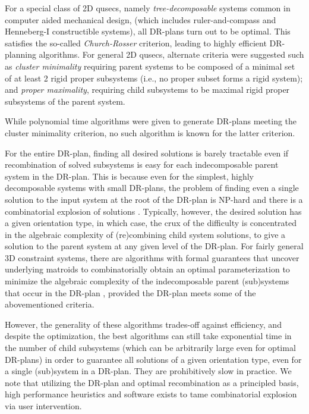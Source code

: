 \medskip\noindent{}
For a special class of 2D qusecs, namely  {\em tree-decomposable} systems
\cite{XX} common in computer aided mechanical design,
(which includes ruler-and-compass and Henneberg-I constructible systems),
all DR-plans turn out to
be optimal. This satisfies the so-called {\em Church-Rosser} criterion,
leading to highly efficient DR-planning algorithms.
For general 2D qusecs, alternate criteria were suggested
such as {\em cluster minimality}
requiring parent systems to be composed of
a minimal set of at least 2 rigid proper subsystems (i.e., no proper
subset forms a rigid system);
and {\em proper maximality}, requiring child subsystems
to be maximal rigid proper subsystems of the parent system.

While polynomial time algorithms were given \cite{XX} to generate DR-plans
meeting the cluster minimality criterion,
no such algorithm is known for the latter criterion.


\medskip\noindent{}
For the entire DR-plan, finding all
desired solutions is barely tractable even if recombination
of solved subsystems is easy for each indecomposable parent system in the
DR-plan.
This is because even for the simplest, highly decomposable systems
with small DR-plans, the problem of finding even a single
solution to the input system at the root of the DR-plan
is NP-hard \cite{XX} and there is a
combinatorial explosion of solutions \cite{XX}. Typically, however,
the desired solution has a given orientation type, in which case,
the crux of the difficulty is concentrated in the algebraic complexity of
(re)combining child system solutions, to give a
solution to the parent system at any
given level of the DR-plan.
For fairly general 3D constraint systems,
there are algorithms with formal
guarantees that uncover underlying matroids to combinatorially
obtain an optimal parameterization to minimize the algebraic
complexity of the indecomposable parent (sub)systems that occur in the
DR-plan \cite{XX, XX,XX},
provided the DR-plan meets some of the abovementioned criteria.

However, the generality of these algorithms
trades-off against efficiency, and despite the optimization,
the best algorithms can still take
exponential time in the number of child subsystems (which can be arbitrarily
large even for optimal DR-plans) in order to guarantee
all solutions of a given orientation type,
even for a single (sub)system in a DR-plan. They
are prohibitively slow in practice. We note that utilizing the DR-plan and
optimal recombination as a principled basis, high performance heuristics
and software
exists \cite{XX,XX} to
tame combinatorial explosion via user intervention.


